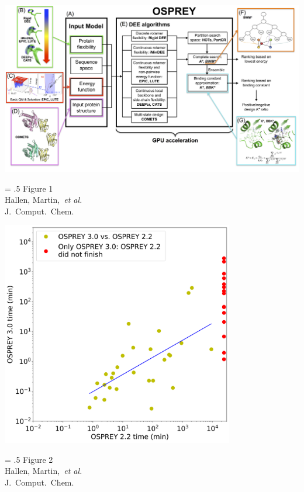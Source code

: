 \begin{center}
\includegraphics[width=6in]{figures/osprey_mantra.png}
\end{center}
\vspace{0.25in}
\hspace*{3in}
{\Large
\begin{minipage}[t]{3in}
\baselineskip = .5\baselineskip
Figure 1 \\
Hallen, Martin,~\textit{et al.}\\
J.\ Comput.\ Chem.
\end{minipage}
}

\newpage

\begin{center}
\includegraphics[width=4in]{figures/2v3_times.png}
\end{center}
\vspace{0.25in}
\hspace*{3in}
{\Large
\begin{minipage}[t]{3in}
\baselineskip = .5\baselineskip
Figure 2 \\
Hallen, Martin,~\textit{et al.}\\
J.\ Comput.\ Chem.
\end{minipage}
}

